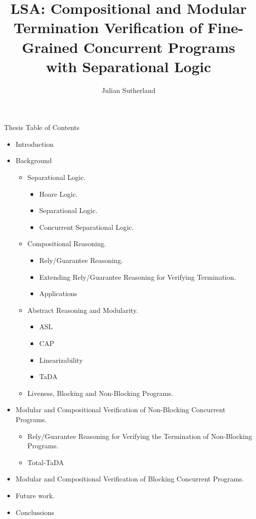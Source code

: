 \documentclass{article}
\title{LSA: Compositional and Modular Termination Verification of Fine-Grained Concurrent Programs with Separational Logic}
\author{Julian Sutherland}
\date{}
\begin{document}
\maketitle
\newpage 

\begin{section}{Thesis Table of Contents}

  \begin{itemize}
  \item Introduction
  \item Background
    \begin{itemize}
    \item Separational Logic.
      \begin{itemize}
      \item Hoare Logic.
      \item Separational Logic.
      \item Concurrent Separational Logic.
      \end{itemize}
    \item Compositional Reasoning.
      \begin{itemize}
      \item Rely/Guarantee Reasoning.
      \item Extending Rely/Guarantee Reasoning for Verifying Termination.
      \item Applications
      \end{itemize}
    \item Abstract Reasoning and Modularity.
      \begin{itemize}
      \item ASL
      \item CAP
      \item Linearizability
      \item TaDA
      \end{itemize}
    \item Liveness, Blocking and Non-Blocking Programs.
    \end{itemize}
  \item Modular and Compositional Verification of Non-Blocking Concurrent Programs.
    \begin{itemize}
    \item Rely/Guarantee Reasoning for Verifying the Termination of Non-Blocking Programs.
    \item Total-TaDA
    \end{itemize}
  \item Modular and Compositional Verification of Blocking Concurrent Programs.
  \item Future work.
  \item Conclussions
  \end{itemize}

\newpage
  
\end{section}
\end{document}
